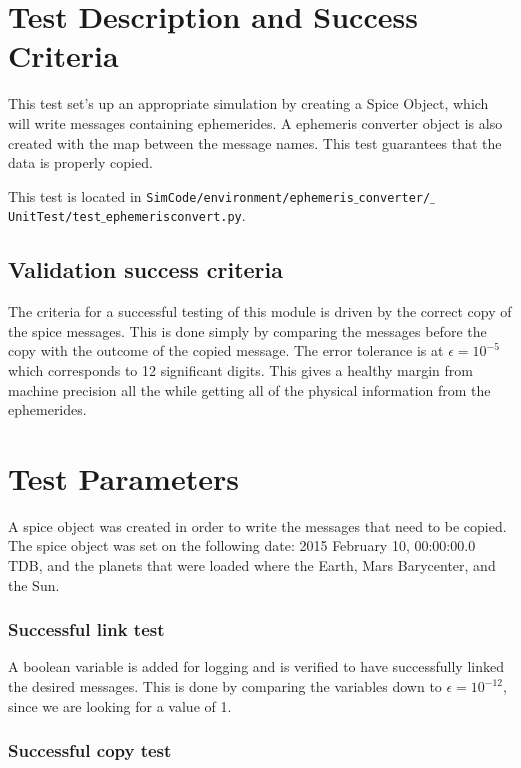 \section{Test Description and Success Criteria}

This test set's up an appropriate simulation by creating a Spice Object, which will write messages containing ephemerides. A ephemeris converter object is also created with the map between the message names. This test guarantees that the data is properly copied.

This test is located in {\tt SimCode/environment/ephemeris$\_$converter/$\_$UnitTest/test$\_$ephemerisconvert.py}. \par

\subsection{Validation success criteria }

The criteria for a successful testing of this module is driven by the correct copy of the spice messages. This is done simply by comparing the messages before the copy with the outcome of the copied message. The error tolerance is at $\epsilon =10^{-5}$ which corresponds to 12 significant digits. This gives a healthy margin from machine precision all the while getting all of the physical information from the ephemerides. 

\section{Test Parameters}

A spice object was created in order to write the messages that need to be copied.
The spice object was set on the following date: 2015 February 10, 00:00:00.0 TDB, and the planets that were loaded where the Earth, Mars Barycenter, and the Sun.

\subsubsection*{Successful link test}

A boolean variable is added for logging and is verified to have successfully linked the desired messages. This is done by comparing the variables down to $\epsilon =10^{-12}$, since we are looking for a value of 1.

\subsubsection*{Successful copy test}

